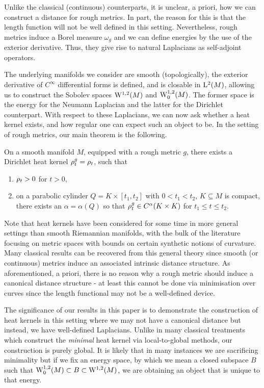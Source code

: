 \documentclass[a4paper, 12pt]{amsart}
\begin{document}
Unlike the classical (continuous) counterparts, it is unclear, a priori, how we can construct a distance
for rough metrics. In part, the reason for this is that the length function will not be well defined in this setting.
Nevertheless,  rough metrics induce a Borel measure $\omega_g$ and we can define energies by the use 
of the exterior derivative. Thus, they give rise to natural Laplacians as self-adjoint operators.

The underlying manifolds we consider are smooth (topologically), the exterior derivative of \(C^{\infty}\) differential forms is defined, and is closable in $\Lp{2}(M)$, allowing us to construct the Sobolev spaces $\SobH{1}(M)$
and $\SobH[0]{1}(M)$. The
former space is the  energy for the Neumann Laplacian
and the latter for the Dirichlet counterpart.
With respect to these Laplacians, we can now ask
whether a heat kernel exists, and how regular one
can expect such an object to be. In the setting of rough metrics, our main theorem
is the following. 

\begin{thm}
On a smooth manifold \(M\), equipped with a rough metric \(g\), there exists a 
Dirichlet heat kernel \(\hk_t^g = \hk_t\), such that
\begin{enumerate}
\item \(\hk_t > 0\) for \(t > 0\),
\item on a parabolic cylinder \(Q = K \times [t_1, t_2]\) with \(0 < t_1 < t_2\), \(K \subseteq M\) is compact, there exists an \(\alpha = \alpha(Q)\) so that \(\hk_t^g \in C^{\alpha}(K \times K)\) for \(t_1 \leq t \leq t_2\).
\end{enumerate}
\end{thm}


Note that heat kernels have been considered
for some time in more general settings than smooth Riemannian manifolds,
with the bulk of the literature focusing on metric spaces with bounds
on certain synthetic notions of curvature.
Many classical results can be recovered from this general 
theory since smooth (or continuous) metrics induce an associated intrinsic
distance structure. As aforementioned, a priori, there is no reason
why a rough metric should induce a canonical distance structure - at least
this cannot be done via minimisation over curves since the
length functional may not be a well-defined device. 

The significance of our results in this paper is to demonstrate
the construction of heat kernels in this setting where we may 
not have a canonical distance but instead, we have well-defined Laplacians. 
Unlike in many classical treatments which construct the \emph{minimal} 
heat kernel via local-to-global methods, our construction is purely global.
It is likely that in many instances we are sacrificing minimality but if we fix
an energy space, by which we mean a closed subspace $B$ such that 
$\SobH[0]{1}(M) \subset B \subset \SobH{1}(M)$, 
we are obtaining an object that is unique to that energy.
\end{document}
